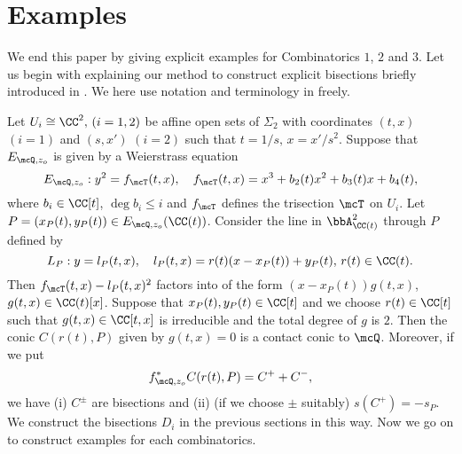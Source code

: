 
\section{Examples}

We end this paper by giving explicit examples for Combinatorics $1$,  $2$ and $3$. 
Let us begin with explaining our method to construct explicit bisections briefly introduced in 
\cite{bannai-tokunaga}. We here use notation and terminology in \cite[2.2.3]{bannai-tokunaga} freely.

Let $U_i \cong \CC^2, \, (i = 1, 2)$ be affine open sets of $\Sigma_2$ with coordinates
$(t, x)$ $(i = 1)$ and $(s, x')$ $(i = 2)$ such that $t = 1/s, \, x = x'/s^2$. Suppose that $E_{\mcQ, z_o}$ is
given by a Weierstrass equation
\[
E_{\mcQ, z_o}: y^2  = f_{\mcT}(t, x), \quad f_{\mcT}(t, x) = x^3 + b_2(t) x^2 + b_3(t)x + b_4(t),
\]
where $b_i \in \CC[t]$, $\deg b_i \le i$ and $f_{\mcT}$ defines the trisection $\mcT$ on $U_i$. Let
$P = (x_P(t), y_P(t)) \in E_{\mcQ, z_o}(\CC(t))$. Consider the line in $\bbA^2_{\CC(t)}$ through
$P$ defined by
\[
L_P : y = l_P(t, x), \quad l_P(t, x) = r(t)(x - x_P(t)) + y_P(t), \, r(t) \in \CC(t).
\]
Then $f_{\mcT}(t, x) - l_P(t,x)^2$ factors into of the form
$(x - x_P(t))g(t, x)$, $g(t, x) \in \CC(t)[x]$. Suppose that $x_P(t), y_P(t) \in \CC[t]$ and we  choose
$r(t) \in \CC[t]$ such that $g(t, x) \in \CC[t,x]$ is irreducible and  the total degree of $g$ is $2$. Then the conic
$C(r(t), P)$ given by $g(t, x) = 0$ is a contact conic to $\mcQ$. Moreover, if we put
\[
f^*_{\mcQ, z_o}C(r(t), P) = C^+ + C^-,
\]
we have (i) $C^{\pm}$ are bisections and (ii) (if we choose $\pm$ suitably) $s(C^+)  = - s_P$.
We construct the bisections $D_i$ in the previous sections in this way. Now we go on to construct 
examples for each combinatorics.



